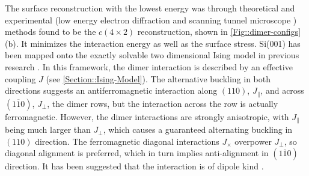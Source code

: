 	The surface reconstruction with the lowest energy was through theoretical \cite{ramstad1995theoretical, pillay2004revisit, inoue1994order, brand2023critical} and experimental (low energy electron diffraction \cite{matsumoto2003low, kubota1994streak, brand2023critical} and scanning tunnel microscope \cite{wolkow1992direct, tochihara1994low})  methods found to be the $c(4\times 2)$ reconstruction, shown in \autoref{Fig::dimer-configs} (b). It minimizes the interaction energy as well as the surface stress. Si(001) has been mapped onto the exactly solvable two dimensional  Ising model in previous research \cite{brand2023dimer, pillay2004revisit, ihm1983structural, schaller2023sequential, inoue1994order}. In this framework, the dimer interaction is described by an effective coupling $J$ (see \autoref{Section::Ising-Model}). The alternative buckling in both directions suggests an antiferromagnetic interaction along $(110)$, $J_\parallel$, and across $(1\overline{1}0)$, $J_\perp$, the dimer rows, but the interaction across the row is actually ferromagnetic. However, the dimer interactions are strongly anisotropic, with $J_\parallel$ being much larger than $J_\perp$, which causes a guaranteed alternating buckling in $(110)$ direction. The ferromagnetic diagonal interactions $J_\times$ overpower $J_\perp$, so diagonal alignment is preferred, which in turn implies anti-alignment in $(1\overline{1}0)$ direction. It has been suggested that the interaction is of dipole kind \cite{pillay2004revisit}.
